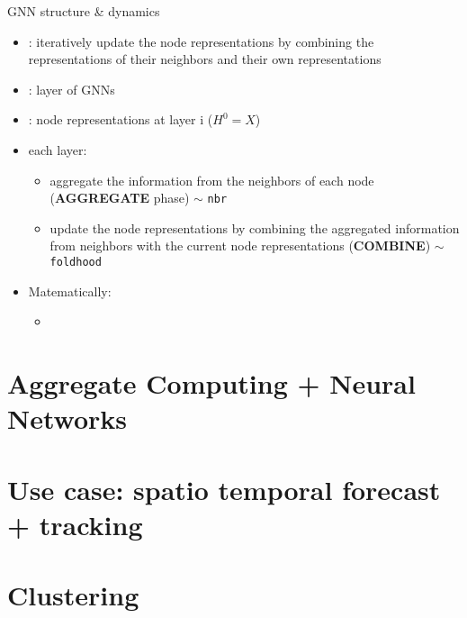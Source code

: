 \documentclass[presentation, 9pt]{beamer}\mode<presentation>{\usetheme{AMSBolognaFC}}
\begin{document}
\begin{frame}{GNN structure \& dynamics}
	\begin{itemize}
		\item {}: iteratively update the node representations 
		by combining the representations of their neighbors and their own representations
		\item {}: layer of GNNs
		\item {}: node representations at layer i ($H^0 = X$)
		\item each layer:
		\begin{itemize}
			\item aggregate the information from the neighbors of each node (\textbf{AGGREGATE} phase) $\sim$ {\lstinline|nbr|}
			\item update the node representations by combining the aggregated information from neighbors with the current node representations (\textbf{COMBINE}) $\sim$ \lstinline|foldhood|
		\end{itemize}
		\item Matematically:
		\begin{itemize}
			\item 
		\end{itemize}
	\end{itemize}
\end{frame}
\section{Aggregate Computing + Neural Networks}


\section{Use case: spatio temporal forecast + tracking}


\section{Clustering}
\end{document}
